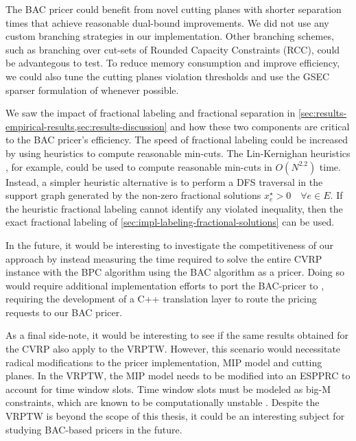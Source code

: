 The BAC pricer could benefit from novel cutting planes with shorter separation times that achieve reasonable dual-bound improvements.
We did not use any custom branching strategies in our implementation.
Other branching schemes, such as branching over cut-sets of Rounded Capacity Constraints (RCC), could be advantegous to test.
To reduce memory consumption and improve efficiency, we could also tune the cutting planes violation thresholds and use the GSEC sparser formulation of  whenever possible.


We saw the impact of fractional labeling and fractional separation in \cref{sec:results-empirical-results,sec:results-discussion} and how these two components are critical to the BAC pricer's efficiency.
The speed of fractional labeling could be increased by using heuristics to compute reasonable min-cuts.
The Lin-Kernighan heuristics \parencite{kernighan1970}, for example, could be used to compute reasonable min-cuts in $O(N^{2.2})$ time.
Instead, a simpler heuristic alternative is to perform a DFS traversal in the support graph generated by the non-zero fractional solutions $x^\star_e > 0 \quad \forall e \in E$.
If the heuristic fractional labeling cannot identify any violated inequality, then the exact fractional labeling of \cref{sec:impl-labeling-fractional-solutions} can be used.


\medskip

In the future, it would be interesting to investigate the competitiveness of our approach by instead measuring the time required to solve the entire CVRP instance with the BPC algorithm using the BAC algorithm as a pricer.
Doing so would require additional implementation efforts to port the BAC-pricer to \bapcod{}, requiring the development of a C++ translation layer to route the \bapcod{} pricing requests to our BAC pricer.

As a final side-note, it would be interesting to see if the same results obtained for the CVRP also apply to the VRPTW.
However, this scenario would necessitate radical modifications to the pricer implementation, MIP model and cutting planes.
In the VRPTW, the MIP model needs to be modified into an ESPPRC to account for time window slots.
Time window slots must be modeled as big-M constraints, which are known to be computationally unstable \parencite{jepsen2008branchandcut}.
Despite the VRPTW is beyond the scope of this thesis, it could be an interesting subject for studying BAC-based pricers in the future.
